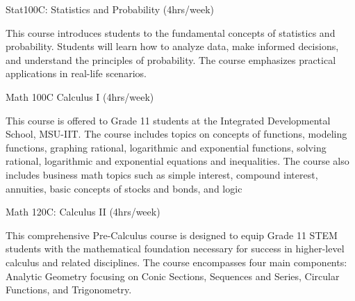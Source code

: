\begin{subject} Stat100C: Statistics and Probability
	\hfill
	(4hrs/week)
\end{subject}
This course introduces students to the fundamental concepts of statistics and probability. Students will learn how to analyze data, make informed decisions, and understand the principles of probability. The course emphasizes practical applications in real-life scenarios.

\begin{subject} Math 100C Calculus I
	\hfill
	(4hrs/week)
\end{subject}
This course is offered to Grade 11 students at the Integrated Developmental School, MSU-IIT. The course includes topics on concepts of functions, modeling functions, graphing rational, logarithmic and exponential functions, solving rational, logarithmic and exponential equations and inequalities. The course also includes business math topics such as simple interest, compound interest, annuities, basic concepts of stocks and bonds, and logic

\begin{subject} Math 120C: Calculus II
	\hfill
	(4hrs/week)
\end{subject}
This comprehensive Pre-Calculus course is designed to equip Grade 11 STEM students with the mathematical foundation necessary for success in higher-level calculus and related disciplines. The course encompasses four main components: Analytic Geometry focusing on Conic Sections, Sequences and Series, Circular Functions, and Trigonometry.